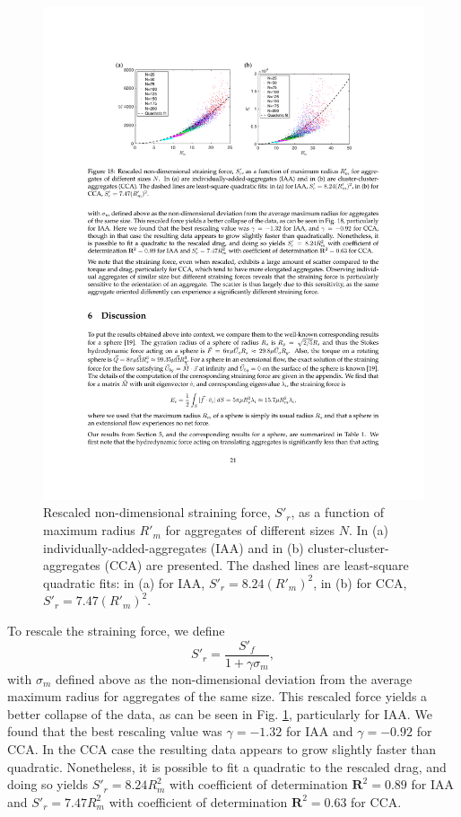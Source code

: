 \begin{figure}[ht]
	\begin{center}
		\includegraphics[scale = 1.0]{./figures/fig_strain_all_rescaledprime.pdf}
	\end{center}
	\caption{Rescaled non-dimensional straining force, $S'_r$, as a function of maximum radius $R'_m$ for aggregates of different sizes $N$. In (a) individually-added-aggregates (IAA) and in (b) cluster-cluster-aggregates (CCA) are presented. The dashed lines are least-square quadratic fits: in (a) for IAA, $S'_r = 8.24  (R'_m)^2 $, in (b) for CCA, $S'_r = 7.47 (R'_m)^2 $. }
	\label{fig_strain_maxR_rescaled}
\end{figure}


To rescale the straining force, we define
\[
S'_r = \frac{S'_f}{1 + \gamma \sigma_m},
\label{eq_strain_rescaled}
\]
with $\sigma_m$ defined above as the non-dimensional deviation from the average maximum radius for aggregates of the same size.
This rescaled force yields a better collapse of the data, as can be seen in Fig. \ref{fig_strain_maxR_rescaled}, particularly for IAA. We found that the best rescaling value was $\gamma = -1.32$ for  IAA and $\gamma= -0.92$ for  CCA.  In the CCA case the resulting data appears to grow slightly faster than quadratic. Nonetheless, it is possible to fit a quadratic to the rescaled drag, and doing so yields $S'_r = 8.24 R_m^2 $ with coefficient of determination $\mathbf{R}^2=0.89$ for IAA and $S'_r = 7.47 R_m^2 $ with coefficient of determination $\mathbf{R}^2=0.63$ for CCA. 


